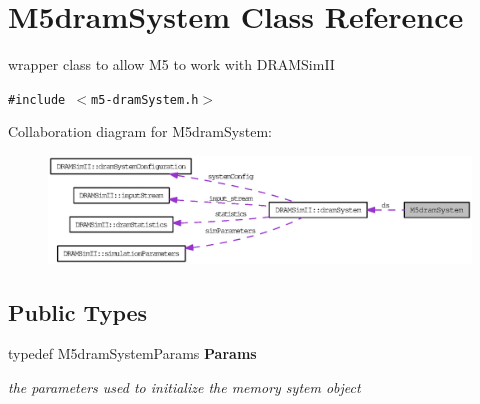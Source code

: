 \section{M5dramSystem Class Reference}
\label{class_m5dram_system}
wrapper class to allow M5 to work with DRAMSimII  


{\tt \#include $<$m5-dramSystem.h$>$}

Collaboration diagram for M5dramSystem:\nopagebreak
\begin{figure}[H]
\begin{center}
\leavevmode
\includegraphics[width=400pt]{class_m5dram_system__coll__graph}
\end{center}
\end{figure}
\subsection*{Public Types}
\begin{CompactItemize}
\item 
typedef M5dramSystemParams {\bf Params}\label{class_m5dram_system_bc049789b7ba009ac06888952383d456}

\begin{CompactList}\small\item\em the parameters used to initialize the memory sytem object \item\end{CompactList}\end{CompactItemize}

